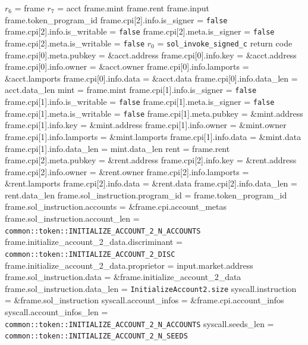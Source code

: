 \begin{algorithm}
\caption{INIT-VAULT-TOKEN-ACCOUNT}
\begin{algorithmic}
  \INPUT $r_6$ = frame
  \INPUT $r_7$ = acct
  \REQUIRE frame.mint
  \REQUIRE frame.rent
  \REQUIRE frame.input
  \REQUIRE frame.token\_program\_id
  \REQUIRE frame.cpi[2].info.is\_signer = \texttt{false}
  \REQUIRE frame.cpi[2].info.is\_writable = \texttt{false}
  \REQUIRE frame.cpi[2].meta.is\_signer = \texttt{false}
  \REQUIRE frame.cpi[2].meta.is\_writable = \texttt{false}
  \ENSURE $r_0$ = \texttt{sol\_invoke\_signed\_c} return code
  \STATE frame.cpi[0].meta.pubkey = \&acct.address
  \STATE frame.cpi[0].info.key = \&acct.address
  \STATE frame.cpi[0].info.owner = \&acct.owner
  \STATE frame.cpi[0].info.lamports = \&acct.lamports
  \STATE frame.cpi[0].info.data = \&acct.data
  \STATE frame.cpi[0].info.data\_len = acct.data\_len
  \STATE mint = frame.mint
  \STATE frame.cpi[1].info.is\_signer = \texttt{false}
  \STATE frame.cpi[1].info.is\_writable = \texttt{false}
  \STATE frame.cpi[1].meta.is\_signer = \texttt{false}
  \STATE frame.cpi[1].meta.is\_writable = \texttt{false}
  \STATE frame.cpi[1].meta.pubkey = \&mint.address
  \STATE frame.cpi[1].info.key = \&mint.address
  \STATE frame.cpi[1].info.owner = \&mint.owner
  \STATE frame.cpi[1].info.lamports = \&mint.lamports
  \STATE frame.cpi[1].info.data = \&mint.data
  \STATE frame.cpi[1].info.data\_len = mint.data\_len
  \STATE rent = frame.rent
  \STATE frame.cpi[2].meta.pubkey = \&rent.address
  \STATE frame.cpi[2].info.key = \&rent.address
  \STATE frame.cpi[2].info.owner = \&rent.owner
  \STATE frame.cpi[2].info.lamports = \&rent.lamports
  \STATE frame.cpi[2].info.data = \&rent.data
  \STATE frame.cpi[2].info.data\_len = rent.data\_len
  \STATE frame.sol\_instruction.program\_id = frame.token\_program\_id
  \STATE frame.sol\_instruction.accounts = \&frame.cpi.account\_metas
  \STATE frame.sol\_instruction.account\_len =
    \texttt{common::token::INITIALIZE\_ACCOUNT\_2\_N\_ACCOUNTS}
  \STATE frame.initialize\_account\_2\_data.discriminant =
    \texttt{common::token::INITIALIZE\_ACCOUNT\_2\_DISC}
  \STATE frame.initialize\_account\_2\_data.proprietor = input.market.address
  \STATE frame.sol\_instruction.data = \&frame.initialize\_account\_2\_data
  \STATE frame.sol\_instruction.data\_len = \texttt{InitializeAccount2.size}
  \STATE syscall.instruction = \&frame.sol\_instruction
  \STATE syscall.account\_infos = \&frame.cpi.account\_infos
  \STATE syscall.account\_infos\_len =
    \texttt{common::token::INITIALIZE\_ACCOUNT\_2\_N\_ACCOUNTS}
  \STATE syscall.seeds\_len = \texttt{common::token::INITIALIZE\_ACCOUNT\_2\_N\_SEEDS}
  \STATE {}
\ENDPROCEDURE
\end{algorithmic}
\end{algorithm}
